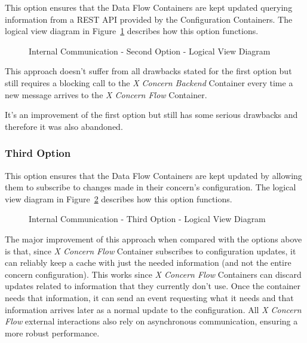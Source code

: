 This option ensures that the Data Flow Containers are kept updated querying information from a \gls{REST} \gls{API} provided by the Configuration Containers. The logical view diagram in Figure~\ref{fig:design:alternatives:internal:second:diagram} describes how this option functions.

\begin{figure}[H]
   \centering
   \resizebox{\columnwidth}{!}
   {
      
   }
   \caption[Internal Communication - Second Option - Logical View Diagram]{Internal Communication - Second Option - Logical View Diagram}
   \label{fig:design:alternatives:internal:second:diagram}
\end{figure}

This approach doesn't suffer from all drawbacks stated for the first option but still requires a blocking call to the \textit{X Concern Backend} Container every time a new message arrives to the \textit{X Concern Flow} Container.

It's an improvement of the first option but still has some serious drawbacks and therefore it was also abandoned.

\subsubsection{Third Option}
\label{subsubsec:design:alternatives:internal:third}

This option ensures that the Data Flow Containers are kept updated by allowing them to subscribe to changes made in their concern's configuration. The logical view diagram in Figure~\ref{fig:design:alternatives:internal:third:diagram} describes how this option functions.

\begin{figure}[H]
   \centering
   \resizebox{\columnwidth}{!}
   {
      
   }
   \caption[Internal Communication - Third Option - Logical View Diagram]{Internal Communication - Third Option - Logical View Diagram}
   \label{fig:design:alternatives:internal:third:diagram}
\end{figure}

The major improvement of this approach when compared with the options above is that, since \textit{X Concern Flow} Container subscribes to configuration updates, it can reliably keep a cache with just the needed information (and not the entire concern configuration). This works since \textit{X Concern Flow} Containers can discard updates related to information that they currently don't use. Once the container needs that information, it can send an event requesting what it needs and that information arrives later as a normal update to the configuration.
All \textit{X Concern Flow} external interactions also rely on asynchronous communication, ensuring a more robust performance.

